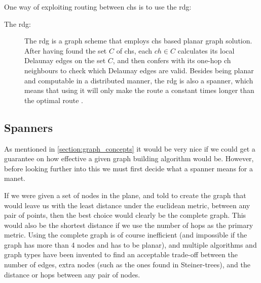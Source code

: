 One way of exploiting routing between \acp{ch} is to use the \ac{rdg}:
\begin{description}
\item[The \ac{rdg}:] The \ac{rdg} is a graph scheme that employs \acp{ch} based planar graph solution. After having found the set $C$ of \acp{ch}, each $ch \in C$ calculates its local Delaunay edges on the set $C$, and then confers with its one-hop \ac{ch} neighbours to check which Delaunay edges are valid. Besides being planar and computable in a distributed manner, the \ac{rdg} is also a spanner, which means that using it will only make the route a constant times longer than the optimal route \cite{GeoSpanners}.
\end{description}


\subsection{Spanners}
\label{section:spanners}
As mentioned in \ref{section:graph_concepts} it would be very nice if we could get a guarantee on how effective a given graph building algorithm would be. However, before looking further into this we must first decide what a spanner means for a \ac{manet}.

If we were given a set of nodes in the plane, and told to create the graph that would leave us with the least distance under the euclidean metric, between any pair of points, then the best choice would clearly be the complete graph. This would also be the shortest distance if we use the number of hops as the primary metric. Using the complete graph is of course inefficient (and impossible if the graph has more than 4 nodes and has to be planar), and multiple algorithms and graph types have been invented to find an acceptable trade-off between the number of edges, extra nodes (such as the ones found in Steiner-trees), and the distance or hops between any pair of nodes.

